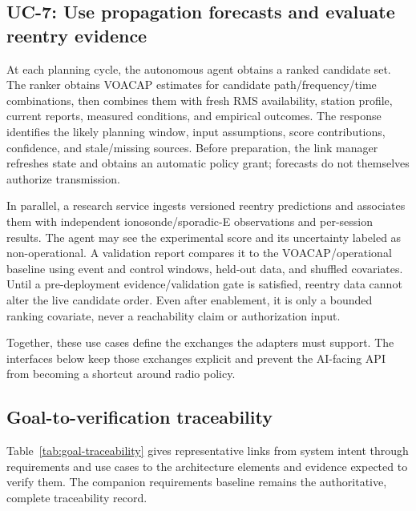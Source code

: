 \documentclass[11pt,a4paper]{article}
\begin{document}
\subsection{UC-7: Use propagation forecasts and evaluate reentry evidence}
At each planning cycle, the autonomous agent obtains a ranked candidate set. The ranker obtains VOACAP estimates for candidate path/frequency/time combinations, then combines them with fresh RMS availability, station profile, current reports, measured conditions, and empirical outcomes. The response identifies the likely planning window, input assumptions, score contributions, confidence, and stale/missing sources. Before preparation, the link manager refreshes state and obtains an automatic policy grant; forecasts do not themselves authorize transmission.

In parallel, a research service ingests versioned reentry predictions and associates them with independent ionosonde/sporadic-E observations and per-session results. The agent may see the experimental score and its uncertainty labeled as non-operational. A validation report compares it to the VOACAP/operational baseline using event and control windows, held-out data, and shuffled covariates. Until a pre-deployment evidence/validation gate is satisfied, reentry data cannot alter the live candidate order. Even after enablement, it is only a bounded ranking covariate, never a reachability claim or authorization input.

Together, these use cases define the exchanges the adapters must support. The
interfaces below keep those exchanges explicit and prevent the AI-facing API
from becoming a shortcut around radio policy.


\subsection{Goal-to-verification traceability}
Table~\ref{tab:goal-traceability} gives representative links from system
intent through requirements and use cases to the architecture elements and
evidence expected to verify them. The companion requirements baseline remains
the authoritative, complete traceability record.
\end{document}
